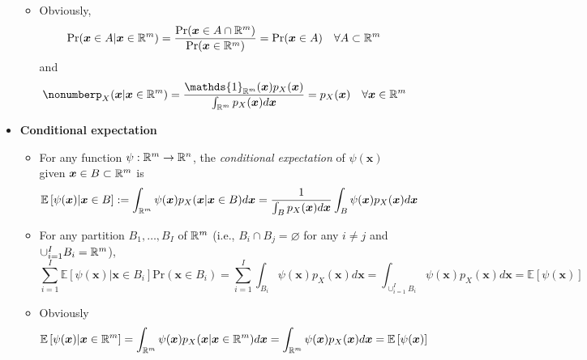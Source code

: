 \documentclass[12pt,a4paper]{article}
\begin{document}
\begin{itemize}
\begin{itemize}
  \item Obviously,
    \begin{equation}\nonumber%
      \text{Pr}(\bm{x}\in A|\bm{x}\in \R^{m})
      = 
      \frac{\text{Pr}(\bm{x}\in A\cap \R^{m})}{\text{Pr}(\bm{x}\in \R^{m})}
      =
      \text{Pr}(\bm{x}\in A)
      \quad \forall A \subset \R^{m}
    \end{equation}
    and
    \begin{equation}\nonumber%
      p_{X}(\bm{x}|\bm{x}\in \R^{m})
      = \frac{\mathds{1}_{\R^{m}}(\bm{x})p_{X}(\bm{x})}{\int_{\R^{m}}p_{X}(\bm{x})d\bm{x}}
      = p_{X}(\bm{x})
      \quad \forall \bm{x} \in \R^{m}
    \end{equation}
  \end{itemize}

\item \textbf{Conditional expectation}
  \begin{itemize}

  \item For any function $\psi:\mathbb{R}^{m}\to\mathbb{R}^{n}$,
    the \emph{conditional expectation} of $\psi(\bm{x})$ given $\bm{x}\in B\subset \mathbb{R}^{m}$ is
    \begin{equation}\label{eq:ExB}%
      \mathbb{E}\left[\psi(\bm{x})| \bm{x}\in B \right]
      := \int_{\R^{m}}\psi(\bm{x})p_{X}(\bm{x}|\bm{x}\in B)d\bm{x}
      =
      \frac{1}{\int_{B}p_{X}(\bm{x})d\bm{x}}\int_{B}\psi(\bm{x})p_{X}(\bm{x})d\bm{x}
    \end{equation}
  \item For any partition $B_{1},\ldots, B_{I}$ of $\mathbb{R}^{m}$ (i.e., $B_{i}\cap B_{j}=\varnothing$ for any $i\neq j$ and $\cup_{i=1}^{I}B_{i}=\mathbb{R}^{m_{}}$),
    \begin{equation}\nonumber%
      \sum_{i=1}^{I}\mathbb{E}\left[\psi(\bm{x})| \bm{x}\in B_{i} \right]\text{Pr}(\bm{x}\in B_{i})
      =
      \sum_{i=1}^{I}\int_{B_{i}}\psi(\bm{x})p_{X}(\bm{x})d\bm{x}
      =
      \int_{\cup_{i=1}^{I}B_{i}}\psi(\bm{x})p_{X}(\bm{x})d\bm{x}
      = \mathbb{E}\left[\psi(\bm{x})\right]
    \end{equation}
  \item Obviously
    \begin{equation}\nonumber%
      \mathbb{E}\left[\psi(\bm{x})| \bm{x}\in \R^{m} \right]
      =
      \int_{\R^{m}}\psi(\bm{x})p_{X}(\bm{x}|\bm{x}\in \R^{m})d\bm{x}
      =
      \int_{\R^{m}}\psi(\bm{x})p_{X}(\bm{x})d\bm{x}
      =
      \mathbb{E}\left[\psi(\bm{x}) \right]
    \end{equation}
  \end{itemize}

\end{itemize}
\end{document}

